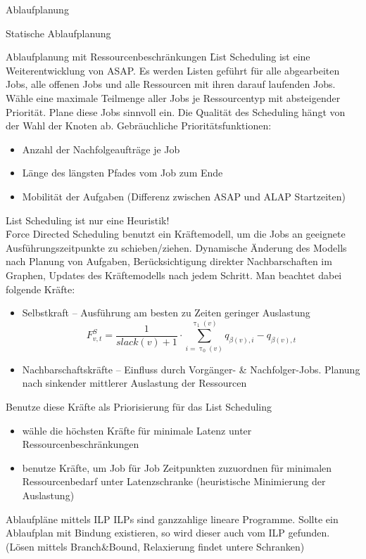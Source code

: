 \begin{chapter}{Ablaufplanung}
\begin{section}{Statische Ablaufplanung}
\begin{subsection}{Ablaufplanung mit Ressourcenbeschränkungen}
    \f{List Scheduling} ist eine Weiterentwicklung von ASAP. Es werden Listen geführt für alle abgearbeiten Jobs, alle offenen Jobs und alle Ressourcen mit ihren darauf laufenden Jobs. Wähle eine maximale Teilmenge aller Jobs je Ressourcentyp mit absteigender Priorität.  Plane diese Jobs sinnvoll ein. Die Qualität des Scheduling hängt von der Wahl der Knoten ab. Gebräuchliche Prioritätsfunktionen:
    \begin{itemize}
     \item Anzahl der Nachfolgeaufträge je Job
     \item Länge des längsten Pfades vom Job zum Ende
     \item Mobilität der Aufgaben (Differenz zwischen ASAP und ALAP Startzeiten)
    \end{itemize}
    List Scheduling ist nur eine Heuristik!\\
    
    \f{Force Directed Scheduling} benutzt ein Kräftemodell, um die Jobs an geeignete Ausführungszeitpunkte zu schieben/ziehen. Dynamische Änderung des Modells nach Planung von Aufgaben, Berücksichtigung direkter Nachbarschaften im Graphen, Updates des Kräftemodells nach jedem Schritt. Man beachtet dabei folgende Kräfte:
    \begin{itemize}
     \item Selbstkraft -- Ausführung am besten zu Zeiten geringer Auslastung
     \[ F_{v,t}^S = \frac{1}{slack(v)+1} \cdot \sum_{i=\uptau_0(v)}^{\uptau_1(v)} q_{\beta(v),i} - q_{\beta(v),t}\]
     \item Nachbarschaftskräfte -- Einfluss durch Vorgänger- \& Nachfolger-Jobs. Planung nach sinkender mittlerer Auslastung der Ressourcen
    \end{itemize}
    Benutze diese Kräfte als Priorisierung für das List Scheduling
    \begin{itemize}
      \item wähle die höchsten Kräfte für minimale Latenz unter Ressourcenbeschränkungen
      \item benutze Kräfte, um Job für Job Zeitpunkten zuzuordnen für minimalen Ressourcenbedarf unter Latenzschranke (heuristische Minimierung der Auslastung)
    \end{itemize}
   \end{subsection}
   
   \begin{subsection}{Ablaufpläne mittels ILP}
    ILPs sind ganzzahlige lineare Programme. Sollte ein Ablaufplan mit Bindung existieren, so wird dieser auch vom ILP gefunden. (Lösen mittels Branch\&Bound, Relaxierung findet untere Schranken)
   \end{subsection}
  \end{section}
  

\end{chapter}
